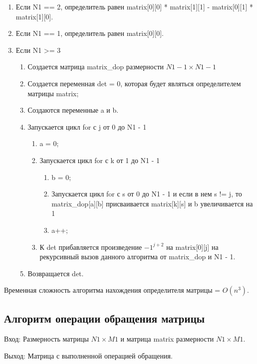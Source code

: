 \documentclass[bachelor, och, labwork]{shiza}
\begin{document}
		\begin{enumerate} 
			\item Если N1 == 2, определитель равен matrix[0][0] * matrix[1][1] - matrix[0][1] * matrix[1][0].
			\item Если N1 == 1, определитель равен matrix[0][0].
			\item Если N1 >= 3
			\begin{enumerate} 
				\item Создается матрица matrix\_dop размерности $N1 - 1 \times N1 - 1$
				\item Создается переменная det = 0, которая будет являться определителем матрицы matrix; 
				\item Создаются переменные a и b.
				\item Запускается цикл for с j от 0 до N1 - 1
				\begin{enumerate} 
					\item a = 0;
					\item Запускается цикл for с k от 1 до N1 - 1
							\begin{enumerate} 
								\item b = 0;
								\item Запускается цикл for с s от 0 до N1 - 1 и если в нем s != j, то matrix\_dop[a][b] присваивается matrix[k][s] и b увеличивается на 1
								\item a++;
							\end{enumerate}	
					\item К det прибавляется произведение $-1^{j + 2}$ на matrix[0][j] на рекурсивный вызов данного алгоритма от matrix\_dop и N1 - 1.
				\end{enumerate}
			\item Возвращается det.
			\end{enumerate}
		\end{enumerate} 
		
		Временная сложность алгоритма нахождения определителя матрицы = $O(n^3)$.

	\subsection{Алгоритм операции обращения матрицы}
	
			$\textit{Вход:}$ Размерность матрицы $N1 \times M1$ и матрица matrix размерности $N1 \times M1$.

			$\textit{Выход:}$  Матрица с выполненной операцией обращения.		
	
\end{document}
